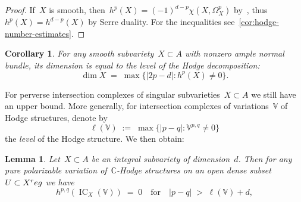 \documentclass[a4paper]{amsart}
\newcommand{\bbC}{\mathbb{C}}
\newcommand{\bbV}{\mathbb{V}}
\newcommand{\reg}{\textup{reg}}
\DeclareMathOperator{\IC}{IC}
\theoremstyle{plain}
\newtheorem{lemma}[theorem]{Lemma}
\newtheorem{corollary}[theorem]{Corollary}
\theoremstyle{definition}
\numberwithin{equation}{section}
\begin{document}
\begin{proof} 
If~$X$ is smooth, then~$h^p(X) = (-1)^{d-p}\chi(X, \Omega^p_X)$ by~\cite[appendix B]{KM}, thus~$h^p(X)=h^{d-p}(X)$ by Serre duality. 
For the inequalities see~\cref{cor:hodge-number-estimates}.
\end{proof} 

\begin{corollary} \label{cor:dim-via-hodge} For any smooth subvariety~$X\subset A$ with nonzero ample normal bundle, its dimension is equal to the level of the Hodge decomposition:
%
\[
 \dim X \;=\; \max \{ |2p-d| \colon h^p(X) \neq 0 \}.
\]
%
\end{corollary} 



For perverse intersection complexes of singular subvarieties~$X\subset A$ we still have an upper bound. More generally, for intersection complexes of variations~$\bbV$ of Hodge structures, denote by
%
\[
 \ell(\bbV) \;:=\; \max \{ |p-q| \colon \bbV^{p,q} \neq 0 \}
\]
%
the \emph{level} of the Hodge structure. We then obtain:

\begin{lemma} \label{Hodge-level-VHS}
Let~$X\subset A$ be an integral subvariety of dimension~$d$. Then for any pure polarizable variation of~$\bbC$-Hodge structures on an open dense subset~$U\subset X^\reg$ we have
%
\[
 h^{p,q}(\IC_X(\bbV)) \;=\; 0 \quad \text{for} \quad |p-q| \;>\; \ell(\bbV) + d,
\]
%
\end{lemma} 
\end{document}
